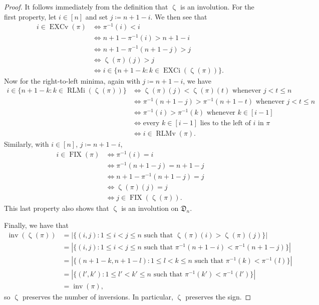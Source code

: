 \documentclass[reqno]{amsart}
\theoremstyle{definition}
\newcommand{\dArr}{\mathfrak{D}}
\DeclareMathOperator{\inv}{inv}
\DeclareMathOperator{\FIX}{FIX}
\DeclareMathOperator{\EXCi}{EXCi}
\DeclareMathOperator{\EXCv}{EXCv}
\DeclareMathOperator{\RLMv}{RLMv}
\DeclareMathOperator{\RLMi}{RLMi}
\DeclareMathOperator{\zetaMap}{\zeta}
\begin{document}
\begin{proof}
It follows immediately from the definition that $\zetaMap$ is an involution. 
For the first property, let $i\in [n]$ and set $j \coloneqq n+1-i$.
We then see that
\begin{align*}
 i\in\EXCv(\pi) &\iff \pi^{-1}(i)<i \\
                &\iff n+1-\pi^{-1}(i)>n+1-i \\
                &\iff n+1-\pi^{-1}(n+1-j)>j \\
                &\iff \zetaMap(\pi)(j)>j \\
                &\iff i\in \{n+1-k:k \in \EXCi(\zetaMap(\pi)) \}.
\end{align*}
Now for the right-to-left minima, again with $j \coloneqq n+1-i$, we have 
\begin{align*}
i\in \{n+1-k:k \in \RLMi(\zetaMap(\pi)) \} &\iff 
\zetaMap(\pi)(j)<\zetaMap(\pi)(t) \text{ whenever } j<t \leq n \\
&\iff \pi^{-1}(n+1-j)>\pi^{-1}(n+1-t) \text{ whenever } j<t \leq n \\
&\iff \pi^{-1}(i)>\pi^{-1}(k) \text{ whenever } k\in[i-1] \\
&\iff \text{every $k\in[i-1]$ lies to the left of $i$ in $\pi$}\\
&\iff i\in\RLMv(\pi).
\end{align*}
%
Similarly, with $i \in [n]$, $j \coloneqq n+1-i$,
\begin{align*}
i\in\FIX(\pi) &\iff \pi^{-1}(i)=i \\
&\iff \pi^{-1}(n+1-j)=n+1-j\\
&\iff n+1-\pi^{-1}(n+1-j)=j\\
&\iff \zetaMap(\pi)(j)=j\\
&\iff j\in\FIX(\zetaMap(\pi)).
\end{align*} 
This last property also shows that $\zetaMap$ is an involution on $\dArr_n$.

Finally, we have that
\begin{align*}
	\inv(\zetaMap(\pi)) &= |\{ (i,j) : 1\leq i < j \leq n \text{ such that } \zetaMap(\pi)(i)>\zetaMap(\pi)(j) \}|\\
	&=|\{ (i,j) : 1\leq i < j \leq n \text{ such that }\pi^{-1}(n+1-i)<\pi^{-1}(n+1-j) \}|\\
	&=|\{ (n+1-k,n+1-l) : 1\leq l < k \leq n \text{ such that }\pi^{-1}(k)<\pi^{-1}(l) \}|\\
	&=|\{ (l',k') : 1\leq l' < k' \leq n \text{ such that }\pi^{-1}(k')<\pi^{-1}(l') \}|\\
	&=\inv(\pi),
\end{align*}
so $\zetaMap$ preserves the number of inversions.
In particular, $\zetaMap$ preserves the sign.
\end{proof}
\end{document}
